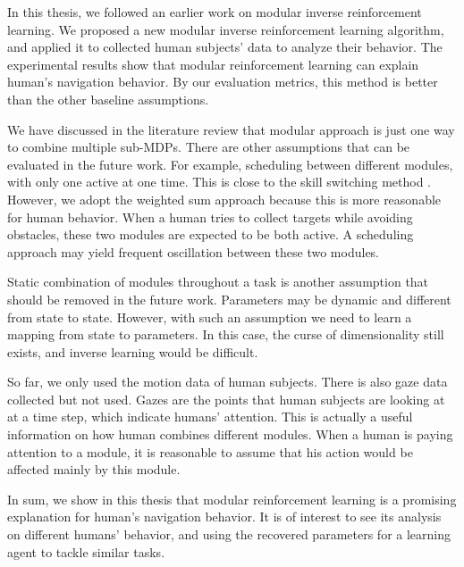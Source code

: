 In this thesis, we followed an earlier work on modular inverse reinforcement
learning. We proposed a new modular inverse reinforcement
learning algorithm, and applied it to collected human subjects' data to analyze
their behavior.
The experimental results show that modular reinforcement learning can explain
human's navigation behavior. By our evaluation metrics, this method is better
than the other baseline assumptions.

We have discussed in the literature review that modular approach is just one way to combine multiple
sub-MDPs. There are other assumptions that can be evaluated in the future work.
For example, scheduling between
different modules, with only one active at one time. This is close to the skill
switching method \cite{konidaris2009skill}. However, we adopt the
weighted sum approach because this is more reasonable for human behavior. When a
human tries to collect targets while avoiding obstacles, these two modules are
expected to be both active. A scheduling approach may yield frequent oscillation
between these two modules.

Static combination of modules throughout a task is another assumption that
should be removed in the future work. Parameters may be dynamic and different from
state to state.  However, with such an assumption we need to learn a mapping
from state to parameters. In this case, the curse of dimensionality still exists,
and inverse learning would be difficult.

So far, we only used the motion data of human subjects. There is also gaze data
collected but not used. Gazes are the points that human subjects are looking at
at a time step, which indicate humans' attention. This is actually a useful
information on how human combines different modules. When a human is paying
attention to a module, it is reasonable to assume that his action would be
affected mainly by this module.

In sum, we show in this thesis that modular reinforcement learning is a
promising explanation for human's navigation behavior. It is of interest to see
its analysis on different humans' behavior, and using the recovered parameters
for a learning agent to tackle similar tasks.

